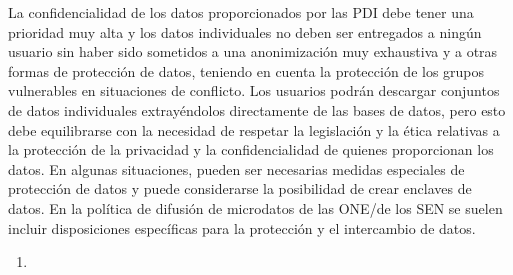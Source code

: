 \documentclass[
]{book}
\begin{document}
\begin{enumerate}
  La confidencialidad de los datos proporcionados por las PDI debe tener una prioridad muy alta y los datos individuales no deben ser entregados a ningún usuario sin haber sido sometidos a una anonimización muy exhaustiva y a otras formas de protección de datos, teniendo en cuenta la protección de los grupos vulnerables en situaciones de conflicto. Los usuarios podrán descargar conjuntos de datos individuales extrayéndolos directamente de las bases de datos, pero esto debe equilibrarse con la necesidad de respetar la legislación y la ética relativas a la protección de la privacidad y la confidencialidad de quienes proporcionan los datos. En algunas situaciones, pueden ser necesarias medidas especiales de protección de datos y puede considerarse la posibilidad de crear enclaves de datos. En la política de difusión de microdatos de las ONE/de los SEN se suelen incluir disposiciones específicas para la protección y el intercambio de datos.

  \begin{enumerate}
  \def\labelenumii{\arabic{enumii}.}
  \item ~
    \hypertarget{mejorar-la-coordinaciuxf3n-estaduxedstica-internacional-y-regional}{%
}
\end{enumerate}
\end{enumerate}
\end{document}

